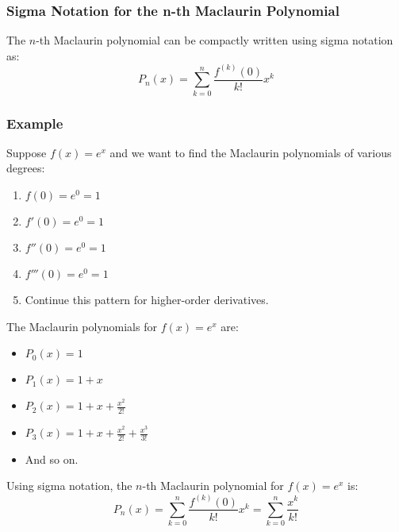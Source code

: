 \documentclass{article}
\begin{document}
\subsubsection*{Sigma Notation for the n-th Maclaurin Polynomial}
The \( n \)-th Maclaurin polynomial can be compactly written using sigma notation as:
\[ P_n(x) = \sum_{k=0}^{n} \frac{f^{(k)}(0)}{k!} x^k \]

\subsubsection*{Example}
Suppose \( f(x) = e^x \) and we want to find the Maclaurin polynomials of various degrees:
\begin{enumerate}
\item \( f(0) = e^0 = 1 \)
\item \( f'(0) = e^0 = 1 \)
\item \( f''(0) = e^0 = 1 \)
\item \( f'''(0) = e^0 = 1 \)
\item Continue this pattern for higher-order derivatives.
\end{enumerate}

The Maclaurin polynomials for \( f(x) = e^x \) are:
\begin{itemize}
\item \( P_0(x) = 1 \)
\item \( P_1(x) = 1 + x \)
\item \( P_2(x) = 1 + x + \frac{x^2}{2!} \)
\item \( P_3(x) = 1 + x + \frac{x^2}{2!} + \frac{x^3}{3!} \)
\item And so on.
\end{itemize}

Using sigma notation, the \( n \)-th Maclaurin polynomial for \( f(x) = e^x \) is:
\[ P_n(x) = \sum_{k=0}^{n} \frac{f^{(k)}(0)}{k!} x^k = \sum_{k=0}^{n} \frac{x^k}{k!} \]

\begin{center}
\end{center}
\end{document}
